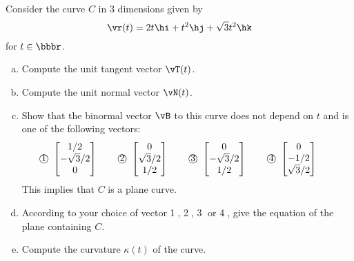 \begin{question}[M317 2016A]  %
Consider the curve $C$ in 3 dimensions given by
\begin{equation*}
\vr(t) = 2t\hi + t^2\hj + \sqrt{3} t^2\hk
\end{equation*}
for $t \in\bbbr$.

\begin{enumerate}[(a)]
\item
Compute the unit tangent vector $\vT(t)$.

\item
Compute the unit normal vector $\vN(t)$.


\item 
Show that the binormal vector $\vB$ to this curve does not depend on 
$t$ and is one of the following vectors:
\begin{equation*}
\text{\textcircled{1}}\ \left[\begin{matrix}
                  1/2 \\
                  -\sqrt{3}/2 \\
                 0
                \end{matrix}\right]\qquad
\text{\textcircled{2}}\ \left[\begin{matrix}
                  0  \\
                  \sqrt{3}/2 \\
                  1/2
                \end{matrix}\right]\qquad
\text{\textcircled{3}}\ \left[\begin{matrix}
                  0 \\
                  -\sqrt{3}/2 \\
                  1/2
                \end{matrix}\right]\qquad
\text{\textcircled{4}}\ \left[\begin{matrix}
                  0\\
                  -1/2 \\
                  \sqrt{3}/2 
                \end{matrix}\right]\qquad
\end{equation*}
This implies that $C$ is a plane curve.

\item
According to your choice of vector \textcircled{1}, \textcircled{2},
\textcircled{3} or \textcircled{4}, give the equation of the plane
containing $C$.

\item
Compute the curvature $\kappa(t)$ of the curve.



\end{enumerate}
\end{question}
